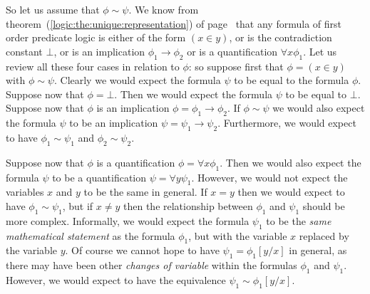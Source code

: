 So let us assume that $\phi\sim\psi$. We know from
theorem~(\ref{logic:the:unique:representation}) of
page~\pageref{logic:the:unique:representation} that any formula of
first order predicate logic is either of the form $(x\in y)$, or is
the contradiction constant $\bot$, or is an implication
$\phi_{1}\to\phi_{2}$ or is a quantification $\forall x\phi_{1}$.
Let us review all these four cases in relation to $\phi$: so suppose
first that $\phi=(x\in y)$ with $\phi\sim\psi$. Clearly we would
expect the formula $\psi$ to be equal to the formula $\phi$. Suppose
now that $\phi=\bot$. Then we would expect the formula $\psi$ to be
equal to $\bot$. Suppose now that $\phi$ is an implication
$\phi=\phi_{1}\to\phi_{2}$. If $\phi\sim\psi$ we would also expect
the formula $\psi$ to be an implication $\psi=\psi_{1}\to\psi_{2}$.
Furthermore, we would expect to have $\phi_{1}\sim\psi_{1}$ and
$\phi_{2}\sim\psi_{2}$.

Suppose now that $\phi$ is a quantification $\phi=\forall
x\phi_{1}$. Then we would also expect the formula $\psi$ to be a
quantification  $\psi=\forall y\psi_{1}$. However, we would not
expect the variables $x$ and $y$ to be the same in general. If $x=y$
then we would expect to have $\phi_{1}\sim\psi_{1}$, but if $x\neq
y$ then the relationship between $\phi_{1}$ and $\psi_{1}$ should be
more complex. Informally, we would expect the formula $\psi_{1}$ to
be the {\em same mathematical statement} as the formula $\phi_{1}$,
but with the variable $x$ replaced by the variable $y$. Of course we
cannot hope to have $\psi_{1}=\phi_{1}[y/x]$ in general, as there
may have been other {\em changes of variable} within the formulas
$\phi_{1}$ and $\psi_{1}$. However, we would expect to have the
equivalence $\psi_{1}\sim\phi_{1}[y/x]$.

